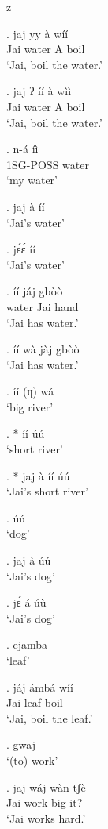 z   \documentclass{assets/fieldnotes}
\begin{document}

\exg. jaj yy à wíí\\
Jai water A boil \\
`Jai, boil the water.'


\exg. jaj ʔ íí à wìì \\
Jai {} water A boil \\
`Jai, boil the water.'

\exg. n-á íì \\ 
1SG-POSS water \\
`my water'


\ex. jaj à íí\\
`Jai's water'


\ex. jɛ́ɛ́ íí \\
`Jai's water'

\exg. íí jáj gbòò \\
water Jai hand \\
`Jai has water.'

\ex. íí wà jàj gbòò \\
`Jai has water.'

\ex. íí (ɥ) wá\\
`big river'

\ex. * íí úú \\
`short river'

\ex. * jaj à íí úú \\
`Jai's short river'

\ex. úú \\
`dog'

\ex. jaj à úú \\
`Jai's dog'

\ex. jɛ́ á úù \\
`Jai's dog'


\ex. ejamba \\
`leaf'

\exg. jáj ámbá wíí \\
Jai leaf boil \\
`Jai, boil the leaf.'

\ex. gwaj \\
`(to) work'

\ex. jaj wáj wàn tʃè \\
Jai work big it? \\
`Jai works hard.'
\end{document}
